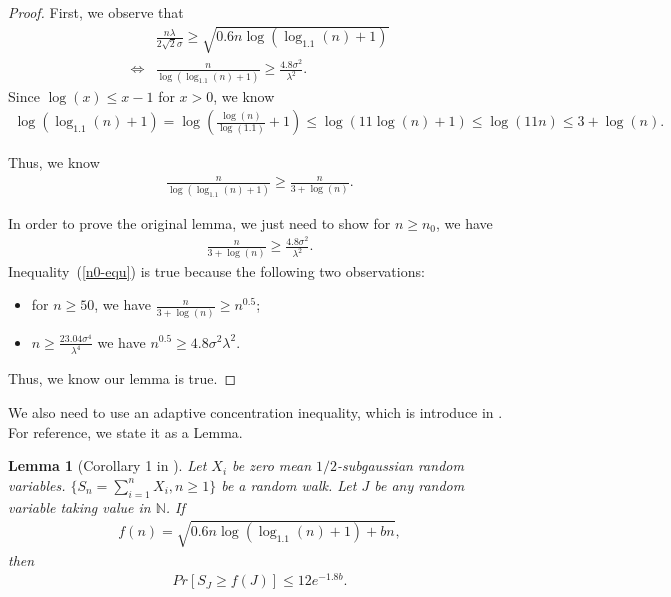 \documentclass{article}
\newtheorem{lemma}{Lemma}
\begin{document}
\begin{proof}
First, we observe that
\begin{align}
&\frac{n\lambda}{2\sqrt{2}\sigma}\geq \sqrt{0.6n\log(\log_{1.1}(n)+1)} \nonumber \\
\iff &\frac{n}{\log(\log_{1.1}(n)+1)}\geq \frac{4.8\sigma^2}{\lambda^2}. \nonumber 
\end{align}
Since $\log(x)\leq x-1$ for $x>0$, we know 
\begin{align}
\log(\log_{1.1}(n)+1)=\log\left(\frac{\log(n)}{\log(1.1)}+1\right)\leq \log(11\log(n)+1)\leq \log(11n)\leq 3+\log(n). \nonumber
\end{align}

Thus, we know
\begin{align}
\frac{n}{\log(\log_{1.1}(n)+1)}\geq \frac{n}{3+\log(n)}. \nonumber 
\end{align}

In order to prove the original lemma, we just need to show for $n\geq n_{0}$, we have
\begin{align}
\frac{n}{3+\log(n)}\geq \frac{4.8\sigma^2}{\lambda^2}. \label{n0-equ}
\end{align}
Inequality~(\ref{n0-equ}) is true because the following two observations:
\begin{itemize}
\item for $n\geq 50$, we have $\frac{n}{3+\log(n)}\geq n^{0.5}$;
\item $n\geq \frac{23.04\sigma^4}{\lambda^4}$ we have $n^{0.5}\geq {4.8\sigma^{2}}{\lambda^{2}}$.
\end{itemize}

Thus, we know our lemma is true.

\end{proof}

We also need to use an adaptive concentration inequality, which is introduce in \cite{zhao2016adaptive}. For reference, we state it as a Lemma.

\begin{lemma}[Corollary 1 in \cite{zhao2016adaptive}]
Let $X_{i}$ be zero mean $1/2$-subgaussian random variables. $\{S_{n}=\sum_{i=1}^{n}X_{i},n\geq 1\}$ be a random walk. Let $J$ be any random variable taking value in $\mathbb{N}$. If
\begin{align}
f(n)=\sqrt{0.6n\log(\log_{1.1}(n)+1)+bn}, \nonumber
\end{align}
then
\begin{align}
Pr[S_{J}\geq f(J)]\leq 12e^{-1.8b}. \nonumber
\end{align}
\label{ACI-inequality}
\end{lemma}
\end{document}
